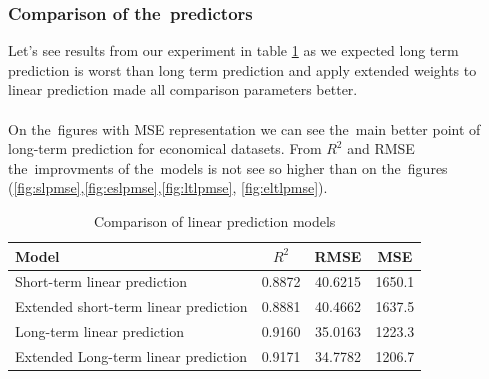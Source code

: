    \subsubsection{Comparison of the~predictors} \label{subsec:res_comparison}
    Let's see results from our experiment in table \ref{tab:model_comparison} as we expected
    long term prediction is worst than long term prediction and apply extended weights to
    linear prediction made all comparison parameters better.\\
    \\
    On the~figures with MSE representation we can see the~main better point of long-term
    prediction for economical datasets. From $R^2$ and RMSE the~improvments of the~models is not
    see so higher than on the~figures (\ref{fig:slpmse},\ref{fig:eslpmse},\ref{fig:ltlpmse}, \ref{fig:eltlpmse}).
    \newpage
    \begin{table}[!ht]
        \centering
        \begin{tabular}{|l|c|c|c|}
            \hline
            Model & $R^2$ & RMSE & MSE \\
            \hline
            Short-term linear prediction & 0.8872 & 40.6215 & 1650.1 \\
            Extended short-term linear prediction & 0.8881 & 40.4662 & 1637.5 \\
            Long-term linear prediction & 0.9160 & 35.0163 & 1223.3 \\
            Extended Long-term linear prediction & 0.9171 & 34.7782 & 1206.7 \\
            \hline
        \end{tabular}
        \caption{Comparison of linear prediction models}
        \label{tab:model_comparison}
    \end{table}

